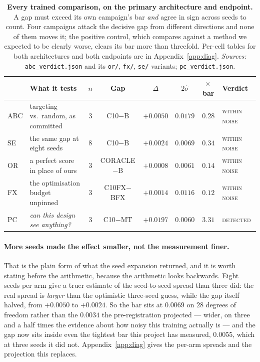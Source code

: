 \documentclass{article} %
\begin{document}
\begin{table}[t]
\caption{\textbf{Every trained comparison, on the primary architecture and endpoint.} A gap must
exceed its own campaign's bar \emph{and} agree in sign across seeds to count. Four campaigns attack
the decisive gap from different directions and none of them moves it; the positive control, which
compares against a method we expected to be clearly worse, clears its bar more than threefold.
Per-cell tables for both architectures and both endpoints are in Appendix~\ref{app:diag}.
\emph{Sources:} \texttt{abc\_verdict.json} and its \texttt{or/}, \texttt{fx/}, \texttt{se/}
variants; \texttt{pc\_verdict.json}.}
\label{tab:trained}
\begin{center}
\small
\setlength{\tabcolsep}{4.5pt}
\begin{tabular}{@{}llcccccl@{}}
\toprule
& What it tests & $n$ & Gap & $\Delta$ & $2\hat{\sigma}$ & $\times$\,bar & Verdict \\
\midrule
ABC & targeting vs.\ random, as committed & $3$ & C10$-$B & $+0.0050$ & $0.0179$ & $0.28$ & \textsc{within noise} \\
SE & the same gap at eight seeds & $8$ & C10$-$B & $+0.0024$ & $0.0069$ & $0.34$ & \textsc{within noise} \\
OR & a perfect score in place of ours & $3$ & CORACLE$-$B & $+0.0008$ & $0.0061$ & $0.14$ & \textsc{within noise} \\
FX & the optimisation budget unpinned & $3$ & C10FX$-$BFX & $+0.0014$ & $0.0116$ & $0.12$ & \textsc{within noise} \\
\midrule
PC & \emph{can this design see anything?} & $3$ & C10$-$MT & $+0.0197$ & $0.0060$ & $\mathbf{3.31}$ & \textsc{detected} \\
\bottomrule
\end{tabular}
\end{center}
\end{table}

\paragraph{More seeds made the effect smaller, not the measurement finer.} That is the plain form of
what the seed expansion returned, and it is worth stating before the arithmetic, because the
arithmetic looks backwards. Eight seeds per arm give a truer estimate of the seed-to-seed spread
than three did: the real spread is \emph{larger} than the optimistic three-seed guess, while the gap
itself halved, from $+0.0050$ to $+0.0024$. So the bar sits at $0.0069$ on $28$ degrees of freedom
rather than the $0.0034$ the pre-registration projected --- wider, on three and a half times the
evidence about how noisy this training actually is --- and the gap now sits inside even the
tightest bar this project has measured, $0.0055$, which at three seeds it did not.
Appendix~\ref{app:diag} gives the per-arm spreads and the projection this replaces.
\end{document}
